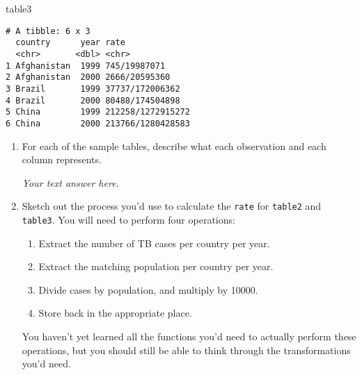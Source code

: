 \documentclass[
  letterpaper,
  DIV=11,
  numbers=noendperiod]{scrreprt}
\newenvironment{Shaded}{\begin{snugshade}}{\end{snugshade}}
\newcommand{\NormalTok}[1]{\textcolor[rgb]{0.00,0.23,0.31}{#1}}
\providecommand{\tightlist}{%
  \setlength{\itemsep}{0pt}\setlength{\parskip}{0pt}}\usepackage{longtable,booktabs,array}
\begin{document}
\begin{tcolorbox}
\begin{Shaded}
\begin{Highlighting}[]
\NormalTok{table3}
\end{Highlighting}
\end{Shaded}

\begin{verbatim}
# A tibble: 6 x 3
  country      year rate             
  <chr>       <dbl> <chr>            
1 Afghanistan  1999 745/19987071     
2 Afghanistan  2000 2666/20595360    
3 Brazil       1999 37737/172006362  
4 Brazil       2000 80488/174504898  
5 China        1999 212258/1272915272
6 China        2000 213766/1280428583
\end{verbatim}

\end{tcolorbox}

\begin{enumerate}
\def\labelenumi{\arabic{enumi}.}
\item
  For each of the sample tables, describe what each observation and each
  column represents.

  \begin{tcolorbox}[enhanced jigsaw, breakable, bottomtitle=1mm, left=2mm, colback=white, toprule=.15mm, leftrule=.75mm, colframe=quarto-callout-note-color-frame, colbacktitle=quarto-callout-note-color!10!white, title={Answer}, coltitle=black, toptitle=1mm, bottomrule=.15mm, opacitybacktitle=0.6, arc=.35mm, rightrule=.15mm, titlerule=0mm, opacityback=0]

  \emph{Your text answer here.}

  \end{tcolorbox}
\item
  Sketch out the process you'd use to calculate the \texttt{rate} for
  \texttt{table2} and \texttt{table3}. You will need to perform four
  operations:

  \begin{enumerate}
  \def\labelenumii{\alph{enumii}.}
  \tightlist
  \item
    Extract the number of TB cases per country per year.
  \item
    Extract the matching population per country per year.
  \item
    Divide cases by population, and multiply by 10000.
  \item
    Store back in the appropriate place.
  \end{enumerate}

  You haven't yet learned all the functions you'd need to actually
  perform these operations, but you should still be able to think
  through the transformations you'd need.


\end{enumerate}
\end{document}
